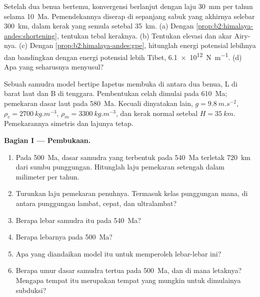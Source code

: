 \begin{exercise}[$\star\star\star$]\label{exo:b2:wilson-cycle:12}
Setelah dua benua bertemu, konvergensi berlanjut dengan laju \qty{30}{mm} per tahun selama \qty{10}{Ma}.
Pemendekannya diserap di sepanjang sabuk yang akhirnya selebar \qty{300}{km}, dalam kerak yang semula
setebal \qty{35}{km}. (a) Dengan \cref{prop:b2:himalaya-andes:shortening}, tentukan tebal
keraknya. (b) Tentukan elevasi dan akar Airy-nya. (c) Dengan \cref{prop:b2:himalaya-andes:gpe},
hitunglah energi potensial lebihnya dan bandingkan dengan energi potensial lebih Tibet, \qty{6.1e12}{N.m^{-1}}.
(d) Apa yang seharusnya menyusul?
\end{exercise}

\begin{problem}\label{pb:b2:wilson-cycle:1}
Sebuah samudra model bertipe Iapetus membuka di antara dua benua, L di barat laut dan B di
tenggara. Pembentukan celah dimulai pada \qty{610}{Ma}; pemekaran dasar laut pada \qty{580}{Ma}.
Kecuali dinyatakan lain, $g = \qty{9.8}{m.s^{-2}}$, $\rho_c = \qty{2700}{kg.m^{-3}}$, $\rho_m =
\qty{3300}{kg.m^{-3}}$, dan kerak normal setebal $H = \qty{35}{km}$. Pemekarannya
simetris dan lajunya tetap.

\medskip
\noindent\textbf{Bagian I --- Pembukaan.}
\begin{enumerate}
\item Pada \qty{500}{Ma}, dasar samudra yang terbentuk pada \qty{540}{Ma} terletak \qty{720}{km} dari sumbu
punggungan. Hitunglah laju pemekaran setengah dalam milimeter per tahun.
\item Turunkan laju pemekaran penuhnya. Termasuk kelas punggungan mana, di antara punggungan lambat,
cepat, dan ultralambat?
\item Berapa lebar samudra itu pada \qty{540}{Ma}?
\item Berapa lebarnya pada \qty{500}{Ma}?
\item Apa yang diandaikan model itu untuk memperoleh lebar-lebar ini?
\item Berapa umur dasar samudra tertua pada \qty{500}{Ma}, dan di mana letaknya? Mengapa tempat itu merupakan
tempat yang mungkin untuk dimulainya subduksi?
\end{enumerate}


\end{problem}
